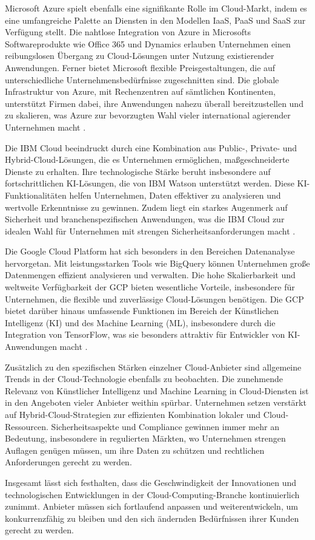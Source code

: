 Microsoft Azure spielt ebenfalls eine signifikante Rolle im Cloud-Markt, indem es eine umfangreiche Palette an Diensten in den Modellen IaaS, PaaS und SaaS zur Verfügung stellt. Die nahtlose Integration von Azure in Microsofts Softwareprodukte wie Office 365 und Dynamics erlauben Unternehmen einen reibungslosen Übergang zu Cloud-Lösungen unter Nutzung existierender Anwendungen. Ferner bietet Microsoft flexible Preisgestaltungen, die auf unterschiedliche Unternehmensbedürfnisse zugeschnitten sind. Die globale Infrastruktur von Azure, mit Rechenzentren auf sämtlichen Kontinenten, unterstützt Firmen dabei, ihre Anwendungen nahezu überall bereitzustellen und zu skalieren, was Azure zur bevorzugten Wahl vieler international agierender Unternehmen macht \cite{[2]}.

Die IBM Cloud beeindruckt durch eine Kombination aus Public-, Private- und Hybrid-Cloud-Lösungen, die es Unternehmen ermöglichen, maßgeschneiderte Dienste zu erhalten. Ihre technologische Stärke beruht insbesondere auf fortschrittlichen KI-Lösungen, die von IBM Watson unterstützt werden. Diese KI-Funktionalitäten helfen Unternehmen, Daten effektiver zu analysieren und wertvolle Erkenntnisse zu gewinnen. Zudem liegt ein starkes Augenmerk auf Sicherheit und branchenspezifischen Anwendungen, was die IBM Cloud zur idealen Wahl für Unternehmen mit strengen Sicherheitsanforderungen macht \cite{[3]}.

Die Google Cloud Platform hat sich besonders in den Bereichen Datenanalyse hervorgetan. Mit leistungsstarken Tools wie BigQuery können Unternehmen große Datenmengen effizient analysieren und verwalten. Die hohe Skalierbarkeit und weltweite Verfügbarkeit der GCP bieten wesentliche Vorteile, insbesondere für Unternehmen, die flexible und zuverlässige Cloud-Lösungen benötigen. Die GCP bietet darüber hinaus umfassende Funktionen im Bereich der Künstlichen Intelligenz (KI) und des Machine Learning (ML), insbesondere durch die Integration von TensorFlow, was sie besonders attraktiv für Entwickler von KI-Anwendungen macht \cite{[4]}.

Zusätzlich zu den spezifischen Stärken einzelner Cloud-Anbieter sind allgemeine Trends in der Cloud-Technologie ebenfalls zu beobachten. Die zunehmende Relevanz von Künstlicher Intelligenz und Machine Learning in Cloud-Diensten ist in den Angeboten vieler Anbieter weithin spürbar. Unternehmen setzen verstärkt auf Hybrid-Cloud-Strategien zur effizienten Kombination lokaler und Cloud-Ressourcen. Sicherheitsaspekte und Compliance gewinnen immer mehr an Bedeutung, insbesondere in regulierten Märkten, wo Unternehmen strengen Auflagen genügen müssen, um ihre Daten zu schützen und rechtlichen Anforderungen gerecht zu werden.

Insgesamt lässt sich festhalten, dass die Geschwindigkeit der Innovationen und technologischen Entwicklungen in der Cloud-Computing-Branche kontinuierlich zunimmt. Anbieter müssen sich fortlaufend anpassen und weiterentwickeln, um konkurrenzfähig zu bleiben und den sich ändernden Bedürfnissen ihrer Kunden gerecht zu werden.